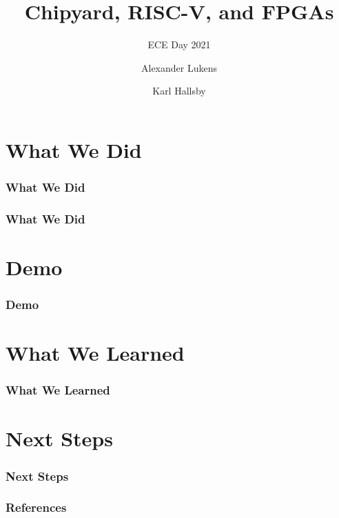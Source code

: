 \documentclass{eceday}
\title[Chipyard]{Chipyard, RISC-V, and FPGAs}
\subtitle{ECE Day 2021}
\author{Alexander Lukens \and Karl Hallsby}
\institute{Illinois Institute of Technology}
\date{\DTMdisplaydate{2021}{4}{9}{-1}}
\begin{document}
\nocite{chipyard}

\begin{frame}
  \titlepage{}
\end{frame}

\section{What We Did}
\begin{frame}
  \frametitle{What We Did}
  \end{frame}

\begin{frame}
  \frametitle{What We Did}
\end{frame}

\section{Demo}\label{sec:Demo}
\begin{frame}
	\frametitle{Demo}
\end{frame}

\section{What We Learned}\label{sec:What_We_Learned}
\begin{frame}
  \frametitle{What We Learned}
\end{frame}

\section{Next Steps}\label{sec:Next_Steps}
\begin{frame}
  \frametitle{Next Steps}
\end{frame}

\begin{frame}
  \frametitle{References}

  \printbibliography[heading=bibintoc]{}
\end{frame}
\end{document}
